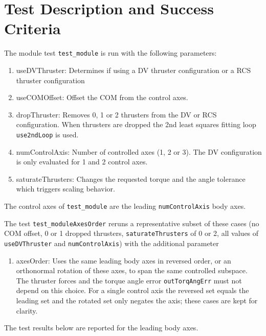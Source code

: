 
\section{Test Description and Success Criteria}
The module test {\tt test\_module} is run with the following parameters:
\begin{enumerate}
\item useDVThruster: Determines if using a DV thruster configuration or a RCS thruster configuration
\item useCOMOffset: Offset the COM from the control axes.
\item dropThruster: Removes 0, 1 or 2 thrusters from the DV or RCS configuration.  When thrusters are dropped the 2nd least squares fitting loop {\tt use2ndLoop} is used.
\item numControlAxis: Number of controlled axes (1, 2 or 3).  The DV configuration is only evaluated for 1 and 2 control axes.
\item saturateThrusters: Changes the requested torque and the angle tolerance which triggers scaling behavior.
\end{enumerate}
The control axes of {\tt test\_module} are the leading {\tt numControlAxis} body axes.

The test {\tt test\_moduleAxesOrder} reruns a representative subset of these cases (no COM offset, 0 or 1 dropped thrusters, {\tt saturateThrusters} of 0 or 2, all values of {\tt useDVThruster} and {\tt numControlAxis}) with the additional parameter
\begin{enumerate}
\item axesOrder: Uses the same leading body axes in reversed order, or an orthonormal rotation of these axes, to span the same controlled subspace.  The thruster forces and the torque angle error {\tt outTorqAngErr} must not depend on this choice.  For a single control axis the reversed set equals the leading set and the rotated set only negates the axis; these cases are kept for clarity.
\end{enumerate}
The test results below are reported for the leading body axes.

